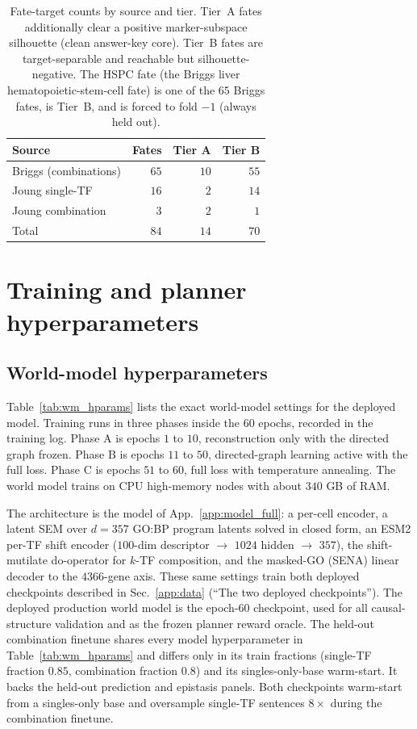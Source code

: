 \begin{table}[h]\centering\footnotesize
\caption{Fate-target counts by source and tier. Tier~A fates additionally clear a positive
marker-subspace silhouette (clean answer-key core). Tier~B fates are target-separable and
reachable but silhouette-negative. The HSPC fate (the Briggs liver hematopoietic-stem-cell
fate) is one of the $65$ Briggs fates, is Tier~B, and is forced to fold $-1$ (always held
out).}
\label{tab:fates}
\begin{tabular}{@{}lrrr@{}}
\toprule
Source & Fates & Tier A & Tier B \\
\midrule
Briggs (combinations)      & $65$ & $10$ & $55$ \\
Joung single-TF            & $16$ & $2$  & $14$ \\
Joung combination          & $3$  & $2$  & $1$  \\
\midrule
Total                      & $84$ & $14$ & $70$ \\
\bottomrule
\end{tabular}
\end{table}

\section{Training and planner hyperparameters}\label{app:hparams}
\subsection{World-model hyperparameters}
Table~\ref{tab:wm_hparams} lists the exact world-model settings for the deployed model.
Training runs in three phases inside the $60$ epochs, recorded in the training log. Phase A
is epochs $1$ to $10$, reconstruction only with the directed graph frozen. Phase B is epochs
$11$ to $50$, directed-graph learning active with the full loss. Phase C is epochs $51$ to
$60$, full loss with temperature annealing. The world model trains on CPU high-memory nodes
with about $340$ GB of RAM.

The architecture is the model of App.~\ref{app:model_full}: a per-cell encoder, a latent
SEM over $d{=}357$ GO:BP program latents solved in closed form, an ESM2 per-TF shift encoder
($100$-dim descriptor $\to$ $1024$ hidden $\to$ $357$), the shift-mutilate do-operator for
$k$-TF composition, and the masked-GO (SENA) linear decoder to the $4366$-gene axis. These
same settings train both deployed checkpoints described in Sec.~\ref{app:data} (``The two
deployed checkpoints''). The deployed production world model is the epoch-$60$ checkpoint,
used for all causal-structure validation and as the frozen planner reward oracle. The
held-out combination finetune shares every model hyperparameter in
Table~\ref{tab:wm_hparams} and differs only in its train fractions (single-TF fraction
$0.85$, combination fraction $0.8$) and its singles-only-base warm-start. It backs the
held-out prediction and epistasis panels. Both checkpoints warm-start from a singles-only
base and oversample single-TF sentences $8\times$ during the combination finetune.

